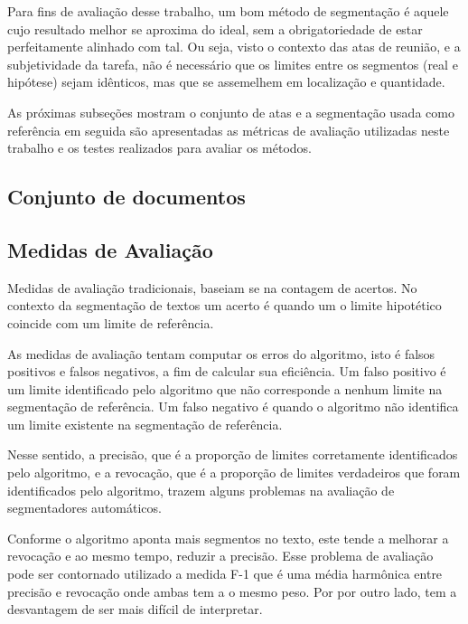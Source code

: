 Para fins de avaliação desse trabalho, um bom método de segmentação é aquele cujo resultado melhor se aproxima do ideal, sem a obrigatoriedade de estar perfeitamente alinhado com tal. Ou seja, visto o contexto das atas de reunião, e a subjetividade da tarefa, não é necessário que os limites entre os segmentos (real e hipótese) sejam idênticos, mas que se assemelhem em localização e quantidade.




As próximas subseções mostram o conjunto de atas e a segmentação usada como referência em seguida são apresentadas as métricas de avaliação utilizadas neste trabalho e os testes realizados para avaliar os métodos.


\subsection{Conjunto de documentos}
	\label{subsec:conjunto-de-documentos}
	
	


\subsection{Medidas de Avaliação}


Medidas de avaliação tradicionais, baseiam se na contagem de acertos. No contexto da segmentação de textos um acerto é quando um o limite hipotético coincide com um limite de referência.

As medidas de avaliação tentam computar os erros do algoritmo, isto é falsos positivos e falsos negativos, a fim de calcular sua eficiência. 
%
Um falso positivo é um limite identificado pelo algoritmo que não corresponde a nenhum limite na segmentação de referência. 
%
Um falso negativo é quando o algoritmo não identifica um limite existente na segmentação de referência.


Nesse sentido, 
%
a precisão, que é a proporção de limites corretamente identificados pelo algoritmo, e 
%
a revocação, que é a proporção de limites verdadeiros que foram identificados pelo algoritmo,
%
trazem alguns problemas na avaliação de segmentadores automáticos.
 	
	
Conforme o algoritmo aponta mais segmentos no texto, este tende a melhorar a revocação e ao mesmo tempo, reduzir a precisão. Esse problema de avaliação pode ser contornado utilizado a medida F-1 que é uma média harmônica entre precisão e revocação onde ambas tem a o mesmo peso. Por por outro lado, tem a desvantagem de ser mais difícil de interpretar. 

